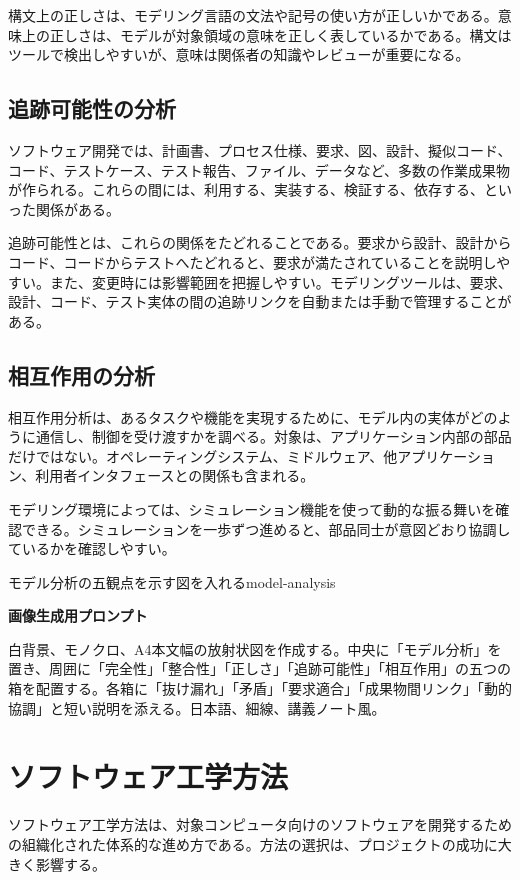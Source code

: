 \documentclass[a4paper,11pt]{ltjsarticle}
\newcommand{\prompt}[1]{\par\noindent\textbf{画像生成用プロンプト}\par\small #1\normalsize}
\begin{document}
構文上の正しさは、モデリング言語の文法や記号の使い方が正しいかである。意味上の正しさは、モデルが対象領域の意味を正しく表しているかである。構文はツールで検出しやすいが、意味は関係者の知識やレビューが重要になる。

\subsection{追跡可能性の分析}
ソフトウェア開発では、計画書、プロセス仕様、要求、図、設計、擬似コード、コード、テストケース、テスト報告、ファイル、データなど、多数の作業成果物が作られる。これらの間には、利用する、実装する、検証する、依存する、といった関係がある。

追跡可能性とは、これらの関係をたどれることである。要求から設計、設計からコード、コードからテストへたどれると、要求が満たされていることを説明しやすい。また、変更時には影響範囲を把握しやすい。モデリングツールは、要求、設計、コード、テスト実体の間の追跡リンクを自動または手動で管理することがある。

\subsection{相互作用の分析}
相互作用分析は、あるタスクや機能を実現するために、モデル内の実体がどのように通信し、制御を受け渡すかを調べる。対象は、アプリケーション内部の部品だけではない。オペレーティングシステム、ミドルウェア、他アプリケーション、利用者インタフェースとの関係も含まれる。

モデリング環境によっては、シミュレーション機能を使って動的な振る舞いを確認できる。シミュレーションを一歩ずつ進めると、部品同士が意図どおり協調しているかを確認しやすい。

\begin{todobox}{モデル分析の五観点を示す図を入れる}{model-analysis}
\prompt{白背景、モノクロ、A4本文幅の放射状図を作成する。中央に「モデル分析」を置き、周囲に「完全性」「整合性」「正しさ」「追跡可能性」「相互作用」の五つの箱を配置する。各箱に「抜け漏れ」「矛盾」「要求適合」「成果物間リンク」「動的協調」と短い説明を添える。日本語、細線、講義ノート風。}
\end{todobox}

\section{ソフトウェア工学方法}
ソフトウェア工学方法は、対象コンピュータ向けのソフトウェアを開発するための組織化された体系的な進め方である。方法の選択は、プロジェクトの成功に大きく影響する。
\end{document}
